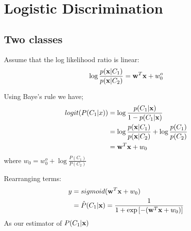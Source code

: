 \section{Logistic Discrimination}
\subsection{Two classes}
     Assume that the log likelihood ratio is linear:
        \[\log\frac{p(\mathbf{x}|C_1)}{p(\mathbf{x}|C_2)} = \mathbf{w}^T\mathbf{x} + w_0^o \]

    Using Baye's rule we have;
        \begin{align*}
            logit(P(C_1|x)) & = \log\frac{p(C_1|\mathbf{x})}{1 - p(C_1|\mathbf{x})} \\
            & = \log\frac{p(\mathbf{x}|C_1)}{p(\mathbf{x}|C_2)} + \log\frac{p(C_1)}{p(C_2)} \\
            & = \mathbf{w}^T\mathbf{x} + w_0
        \end{align*}
        where $w_0 = w_0^o + \log\frac{P(C_1)}{P(C_2)}$

       Rearranging terms: 
        \begin{align*} y  & = sigmoid(\mathbf{w}^T\mathbf{x} + w_0) \\
            & =  \hat{P}(C_1|\mathbf{x}) = \frac{1}{1 + \exp\left[-(\mathbf{w}^T\mathbf{x} + w_0 )\right]}
        \end{align*}
        As our estimator of $P(C_1|\mathbf{x})$

